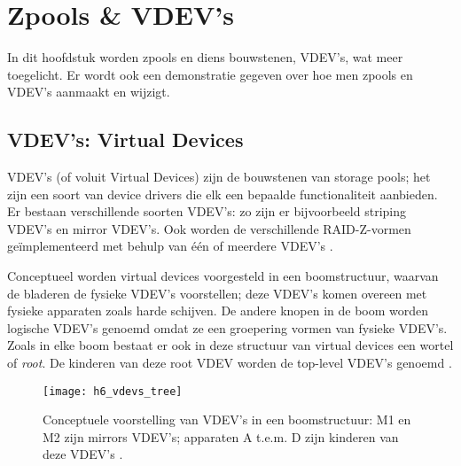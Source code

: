 

\chapter{Zpools \& VDEV's}
\label{ch:h6}

In dit hoofdstuk worden zpools en diens bouwstenen, VDEV's, wat meer toegelicht. Er wordt ook een demonstratie gegeven over hoe men zpools en VDEV's aanmaakt en wijzigt.

\section{VDEV's: Virtual Devices}

VDEV's (of voluit Virtual Devices) zijn de bouwstenen van storage pools; het zijn een soort van device drivers die elk een bepaalde functionaliteit aanbieden. Er bestaan verschillende soorten VDEV's: zo zijn er bijvoorbeeld striping VDEV's en mirror VDEV's. Ook worden de verschillende RAID-Z-vormen geïmplementeerd met behulp van één of meerdere VDEV's \autocite{ZFSBonwick}.

Conceptueel worden virtual devices voorgesteld in een boomstructuur, waarvan de bladeren de fysieke VDEV's voorstellen; deze VDEV's komen overeen met fysieke apparaten zoals harde schijven. De andere knopen in de boom worden logische VDEV's genoemd omdat ze een groepering vormen van fysieke VDEV's. Zoals in elke boom bestaat er ook in deze structuur van virtual devices een wortel of \textit{root}. De kinderen van deze root VDEV worden de top-level VDEV's genoemd \autocite{Microsystems2006}.

\begin{figure}
  \centering
  \texttt{[image: h6\_vdevs\_tree]}
  \caption{Conceptuele voorstelling van VDEV's in een boomstructuur: M1 en M2 zijn mirrors VDEV's; apparaten A t.e.m. D zijn kinderen van deze VDEV's \autocite{Microsystems2006}.}
  \label{fig:vdevs_boom}
\end{figure}

\lipsum
